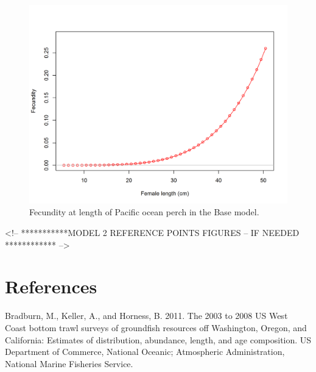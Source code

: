\documentclass[12pt,]{article}
\begin{document}
\begin{figure}
\centering
\includegraphics{r4ss/plots_mod1/bio9_fecundity_len.png}
\caption{Fecundity at length of Pacific ocean perch in the Base model.
\label{fig:fecundity}}
\end{figure}

\FloatBarrier

\FloatBarrier

\FloatBarrier

\FloatBarrier

\FloatBarrier

\FloatBarrier

\FloatBarrier
<!-- ***********MODEL 2 REFERENCE POINTS FIGURES  -- IF NEEDED ************ -->

\newpage

\color{black}

\section*{References}\label{references}

\renewcommand{\thepage}{}

\hypertarget{refs}{}
\hypertarget{ref-bradburn_2003_2011}{}
Bradburn, M., Keller, A., and Horness, B. 2011. The 2003 to 2008 US West
Coast bottom trawl surveys of groundfish resources off Washington,
Oregon, and California: Estimates of distribution, abundance, length,
and age composition. US Department of Commerce, National Oceanic;
Atmospheric Administration, National Marine Fisheries Service.
\end{document}
